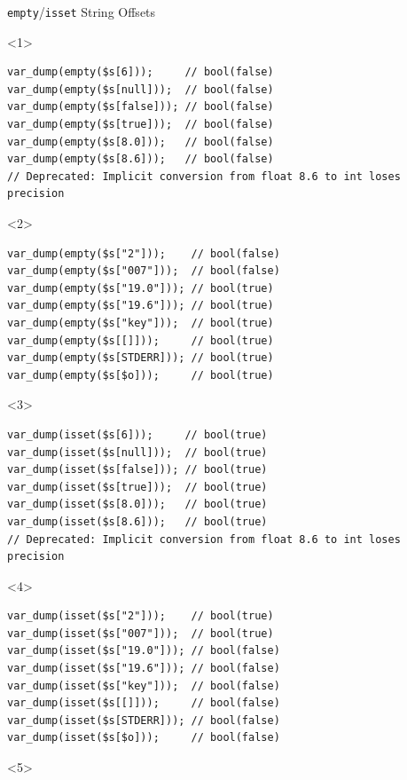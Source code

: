 \documentclass[aspectratio=169]{beamer}
\begin{document}
\begin{frame}[fragile]{\texttt{empty}/\texttt{isset} String Offsets}
    \begin{onlyenv}<1>
        \begin{verbatim}
var_dump(empty($s[6]));     // bool(false)
var_dump(empty($s[null]));  // bool(false)
var_dump(empty($s[false])); // bool(false)
var_dump(empty($s[true]));  // bool(false)
var_dump(empty($s[8.0]));   // bool(false)
var_dump(empty($s[8.6]));   // bool(false)
// Deprecated: Implicit conversion from float 8.6 to int loses precision
        \end{verbatim}
    \end{onlyenv}
    \begin{onlyenv}<2>
        \begin{verbatim}
var_dump(empty($s["2"]));    // bool(false)
var_dump(empty($s["007"]));  // bool(false)
var_dump(empty($s["19.0"])); // bool(true)
var_dump(empty($s["19.6"])); // bool(true)
var_dump(empty($s["key"]));  // bool(true)
var_dump(empty($s[[]]));     // bool(true)
var_dump(empty($s[STDERR])); // bool(true)
var_dump(empty($s[$o]));     // bool(true)
        \end{verbatim}
    \end{onlyenv}
    \begin{onlyenv}<3>
        \begin{verbatim}
var_dump(isset($s[6]));     // bool(true)
var_dump(isset($s[null]));  // bool(true)
var_dump(isset($s[false])); // bool(true)
var_dump(isset($s[true]));  // bool(true)
var_dump(isset($s[8.0]));   // bool(true)
var_dump(isset($s[8.6]));   // bool(true)
// Deprecated: Implicit conversion from float 8.6 to int loses precision
        \end{verbatim}
    \end{onlyenv}
    \begin{onlyenv}<4>
        \begin{verbatim}
var_dump(isset($s["2"]));    // bool(true)
var_dump(isset($s["007"]));  // bool(true)
var_dump(isset($s["19.0"])); // bool(false)
var_dump(isset($s["19.6"])); // bool(false)
var_dump(isset($s["key"]));  // bool(false)
var_dump(isset($s[[]]));     // bool(false)
var_dump(isset($s[STDERR])); // bool(false)
var_dump(isset($s[$o]));     // bool(false)
        \end{verbatim}
    \end{onlyenv}
    \begin{onlyenv}<5>
        \begin{verbatim}

\end{verbatim}
\end{onlyenv}
\end{frame}
\end{document}
